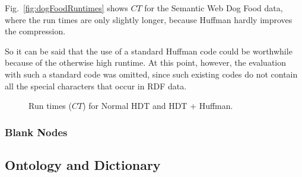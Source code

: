 Fig.~\ref{fig:dogFoodRuntimes} shows $CT$ for the Semantic Web Dog Food data, where the run times are only slightly longer, because Huffman hardly improves the compression.

So it can be said that the use of a standard Huffman code could be worthwhile because of the otherwise high runtime. At this point, however, the evaluation with such a standard code was omitted, since such existing codes do not contain all the special characters that occur in RDF data.


\begin{figure}[h]
	\centering
	\hfill
	\caption{Run times ($CT$) for Normal HDT and HDT + Huffman.}
	\label{fig:huffmanRuntimes}
\end{figure}

\subsubsection{Blank Nodes}

\subsection{Ontology and Dictionary}






























